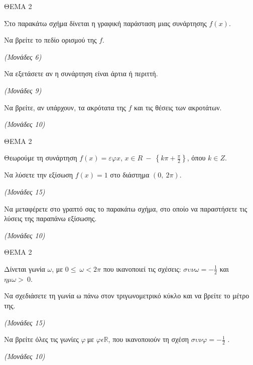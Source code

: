 \documentclass[11pt,a4paper,twoside]{book}
\newcommand{\monades}[1]{\hfill \textit{(Μονάδες #1)}}
\begin{document}
\vspace{4mm}

ΘΕΜΑ 2

Στο παρακάτω σχήμα δίνεται η γραφική παράσταση μιας συνάρτησης $f(x)$.

\begin{alist}
\item Να βρείτε το πεδίο ορισμού της $f$.

\monades{6}

\item Να εξετάσετε αν η συνάρτηση είναι άρτια ή περιττή.

\monades{9}

\item Να βρείτε, αν υπάρχουν, τα ακρότατα της $f$ και τις θέσεις των ακροτάτων.

\monades{10}
\end{alist}

\vspace{4mm}

ΘΕΜΑ 2

Θεωρούμε τη συνάρτηση $f(x) = \varepsilon\varphi x$, $x \in R\  - \ \left\{ k\pi + \frac{\pi}{2} \right\}$, όπου $k \in Z$.

\begin{alist}
\item Να λύσετε την εξίσωση $f(x) = 1$ στο διάστημα $(0,\ 2\pi)$.

\monades{15}

\item Να μεταφέρετε στο γραπτό σας το παρακάτω σχήμα, στο οποίο να παραστήσετε τις λύσεις της παραπάνω εξίσωσης.

\monades{10}
\end{alist}

\vspace{4mm}

ΘΕΜΑ 2

Δίνεται γωνία $\omega$, με $0 \leq \ \omega < 2\pi$ που ικανοποιεί τις σχέσεις: $\sigma\upsilon\nu\omega = - \frac{1}{2}$ και $\eta\mu\omega > \ 0$.

\begin{alist}
\item Να σχεδιάσετε τη γωνία ω πάνω στον τριγωνομετρικό κύκλο και να βρείτε το μέτρο της.

\monades{15}

\item Να βρείτε όλες τις γωνίες $\varphi\ $με $\varphi\epsilon\mathbb{R}$, που ικανοποιούν τη σχέση $\sigma\upsilon\nu\varphi = - \frac{1}{2}$ .

\monades{10}
\end{alist}
\end{document}

